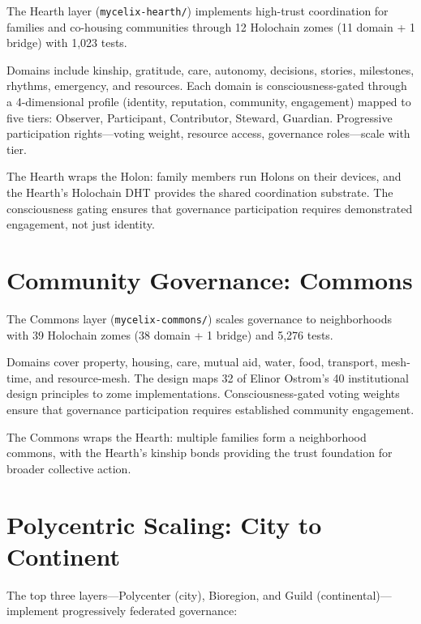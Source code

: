 \documentclass[11pt,twocolumn]{article}
\begin{document}
The Hearth layer (\texttt{mycelix-hearth/}) implements high-trust coordination for families and co-housing communities through 12 Holochain zomes (11 domain + 1 bridge) with 1,023 tests.

Domains include kinship, gratitude, care, autonomy, decisions, stories, milestones, rhythms, emergency, and resources. Each domain is consciousness-gated through a 4-dimensional profile (identity, reputation, community, engagement) mapped to five tiers: Observer, Participant, Contributor, Steward, Guardian. Progressive participation rights---voting weight, resource access, governance roles---scale with tier.

The Hearth wraps the Holon: family members run Holons on their devices, and the Hearth's Holochain DHT provides the shared coordination substrate. The consciousness gating ensures that governance participation requires demonstrated engagement, not just identity.

\section{Community Governance: Commons}
\label{sec:commons}

The Commons layer (\texttt{mycelix-commons/}) scales governance to neighborhoods with 39 Holochain zomes (38 domain + 1 bridge) and 5,276 tests.

Domains cover property, housing, care, mutual aid, water, food, transport, mesh-time, and resource-mesh. The design maps 32 of Elinor Ostrom's 40 institutional design principles \cite{ostrom1990} to zome implementations. Consciousness-gated voting weights ensure that governance participation requires established community engagement.

The Commons wraps the Hearth: multiple families form a neighborhood commons, with the Hearth's kinship bonds providing the trust foundation for broader collective action.

\section{Polycentric Scaling: City to Continent}
\label{sec:polycenter}

The top three layers---Polycenter (city), Bioregion, and Guild (continental)---implement progressively federated governance:
\end{document}
